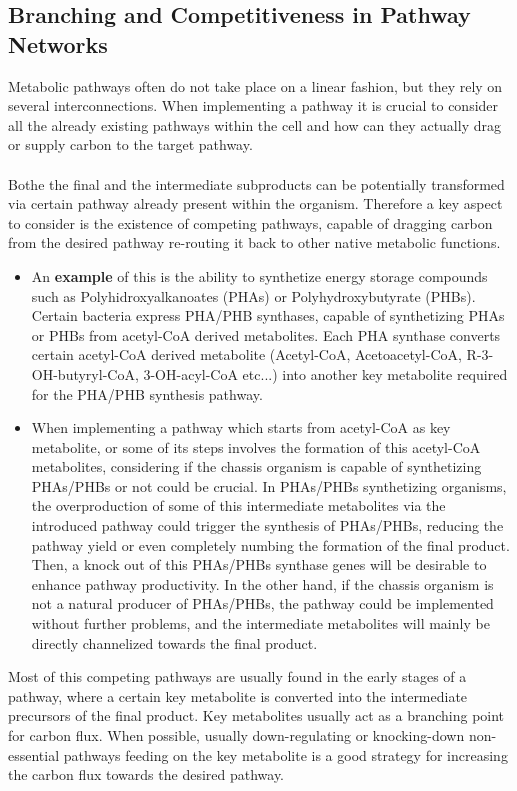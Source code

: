 \subsection{Branching and Competitiveness in Pathway Networks}
Metabolic pathways often do not take place on a linear fashion, but they rely on several interconnections. When implementing a pathway it is crucial to consider all the already existing pathways within the cell and how can they actually drag or supply carbon to the target pathway. \\ \\
Bothe the final and the intermediate subproducts can be potentially transformed via certain pathway already present within the organism. Therefore a key aspect to consider is the existence of competing pathways, capable of dragging carbon from the desired pathway re-routing it back to other native metabolic functions.
\begin{itemize}
    \item[] An \textbf{example} of this is the ability to synthetize energy storage compounds such as Polyhidroxyalkanoates (PHAs) or Polyhydroxybutyrate (PHBs). Certain bacteria express PHA/PHB synthases, capable of synthetizing PHAs or PHBs from acetyl-CoA derived metabolites. Each PHA synthase converts certain acetyl-CoA derived metabolite (Acetyl-CoA, Acetoacetyl-CoA, R-3-OH-butyryl-CoA, 3-OH-acyl-CoA etc...) into another key metabolite required for the PHA/PHB synthesis pathway.
 
    \item[] When implementing  a pathway which starts from acetyl-CoA as key metabolite, or some of its steps involves the formation of this acetyl-CoA metabolites, considering if the chassis organism is capable of synthetizing PHAs/PHBs or not could be crucial. In PHAs/PHBs synthetizing organisms, the overproduction of some of this intermediate metabolites via the introduced pathway could trigger the synthesis of PHAs/PHBs, reducing the pathway yield or even completely numbing  the formation of the final product. Then, a knock out of this PHAs/PHBs synthase genes will be desirable to enhance pathway productivity. In the other hand, if the chassis organism is not a natural producer of PHAs/PHBs, the pathway could be implemented without further problems, and the intermediate metabolites will mainly be directly channelized towards the final product.
\end{itemize}
Most of this competing pathways are usually found in the early stages of a pathway, where a certain key metabolite is converted into the intermediate precursors of the final product. Key metabolites usually act as a branching point for carbon flux. When possible, usually down-regulating or knocking-down non-essential pathways feeding on the key metabolite is a good strategy for increasing the carbon flux towards the desired pathway.
